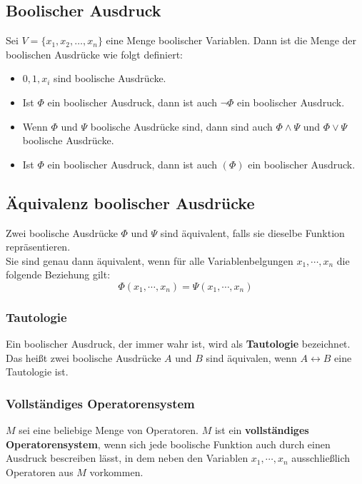 \documentclass[12pt]{article}
\begin{document}
\subsection{Boolischer Ausdruck}
Sei $V = \{x_1, x_2, \dots, x_n\}$ eine Menge boolischer Variablen. Dann ist die Menge der boolischen Ausdrücke wie folgt definiert: \\
\begin{itemize}
    \item $0,1,x_i$ sind boolische Ausdrücke.
    \item Ist $\Phi$ ein boolischer Ausdruck, dann ist auch $\neg \Phi$ ein boolischer Ausdruck.
    \item Wenn $\Phi$ und $\Psi$ boolische Ausdrücke sind, dann sind auch $\Phi \land \Psi$ und $\Phi \lor \Psi$ boolische Ausdrücke.
    \item Ist $\Phi$ ein boolischer Ausdruck, dann ist auch $(\Phi)$ ein boolischer Ausdruck.
\end{itemize}
\subsection{Äquivalenz boolischer Ausdrücke}
Zwei boolische Ausdrücke $\Phi$ und $\Psi$ sind äquivalent, falls sie dieselbe Funktion repräsentieren. \\ 
Sie sind genau dann äquivalent, wenn für alle Variablenbelgungen $x_1, \cdots, x_n$ die folgende Beziehung gilt:
\[\Phi(x_1,\cdots,x_n) = \Psi(x_1,\cdots,x_n)\]
\subsubsection{Tautologie}
Ein boolischer Ausdruck, der immer wahr ist, wird als \textbf{Tautologie} bezeichnet.\\
Das heißt zwei boolische Ausdrücke $A$ und $B$ sind äquivalen, wenn $A \leftrightarrow B$ eine Tautologie ist.
\subsubsection{Vollständiges Operatorensystem}
$M$ sei eine beliebige Menge von Operatoren. $M$ ist ein \textbf{vollständiges Operatorensystem}, wenn sich jede boolische Funktion auch durch einen Ausdruck bescreiben lässt, in dem neben den Variablen $x_1, \cdots, x_n$ ausschließlich Operatoren aus $M$ vorkommen.
\end{document}
